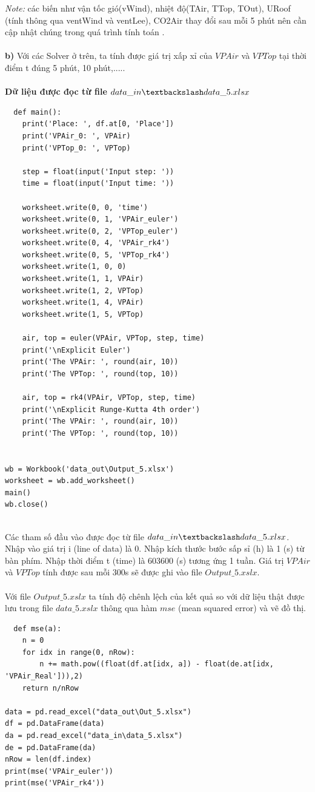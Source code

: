 \documentclass[a4paper]{article}
\begin{document}
\textit{Note: } các biến như vận tốc gió(vWind), nhiệt độ(TAir, TTop, TOut), URoof (tính thông qua ventWind và ventLee), CO2Air thay đổi sau mỗi 5 phút nên cần cập nhật chúng trong quá trình tính toán .
\\\\
\textbf{b)}
Với các Solver ở trên, ta tính được giá trị xấp xỉ của $VPAir$ và $VPTop$ tại thời điểm t đúng 5 phút, 10 phút,.....
\\\\
\textbf{Dữ liệu được đọc từ file $data\_in\textbackslash data\_5.xlsx$} \\
\begin{verbatim}
  def main():
    print('Place: ', df.at[0, 'Place'])
    print('VPAir_0: ', VPAir)
    print('VPTop_0: ', VPTop)

    step = float(input('Input step: '))
    time = float(input('Input time: '))

    worksheet.write(0, 0, 'time')
    worksheet.write(0, 1, 'VPAir_euler')
    worksheet.write(0, 2, 'VPTop_euler')
    worksheet.write(0, 4, 'VPAir_rk4')
    worksheet.write(0, 5, 'VPTop_rk4')
    worksheet.write(1, 0, 0)
    worksheet.write(1, 1, VPAir)
    worksheet.write(1, 2, VPTop)
    worksheet.write(1, 4, VPAir)
    worksheet.write(1, 5, VPTop)

    air, top = euler(VPAir, VPTop, step, time)
    print('\nExplicit Euler')
    print('The VPAir: ', round(air, 10))
    print('The VPTop: ', round(top, 10))

    air, top = rk4(VPAir, VPTop, step, time)
    print('\nExplicit Runge-Kutta 4th order')
    print('The VPAir: ', round(air, 10))
    print('The VPTop: ', round(top, 10))


wb = Workbook('data_out\Output_5.xlsx')
worksheet = wb.add_worksheet()
main()
wb.close()
\end{verbatim}
\\
Các tham số đầu vào được đọc từ file $data\_in\textbackslash data\_5.xlsx$. Nhập vào giá trị i (line of data) là 0. Nhập kích thước bước sấp sỉ (h) là 1 (s) từ bàn phím. Nhập thời điểm t (time) là 603600 (s) tương ứng 1 tuần. Giá trị $VPAir$ và $VPTop$ tính được sau mỗi 300s sẽ được ghi vào file $Output\_5.xslx$.\\\\
Với file $Output\_5.xslx$ ta tính độ chênh lệch của kết quả so với dữ liệu thật được lưu trong file $data\_5.xslx$ thông qua hàm $mse$ (mean squared error) và vẽ đồ thị.
\begin{verbatim}
  def mse(a):
    n = 0
    for idx in range(0, nRow):
        n += math.pow((float(df.at[idx, a]) - float(de.at[idx, 'VPAir_Real'])),2)
    return n/nRow

data = pd.read_excel("data_out\Out_5.xlsx")
df = pd.DataFrame(data)
da = pd.read_excel("data_in\data_5.xlsx")
de = pd.DataFrame(da)
nRow = len(df.index)
print(mse('VPAir_euler'))
print(mse('VPAir_rk4'))
\end{verbatim}
\end{document}
